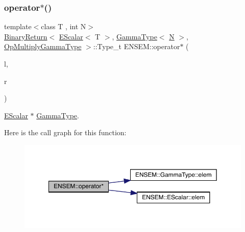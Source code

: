 \subsubsection{\texorpdfstring{operator$\ast$()}{operator*()}\hspace{0.1cm}{\footnotesize\ttfamily [5/9]}}
{\footnotesize\ttfamily template$<$class T , int N$>$ \\
\mbox{\hyperlink{structENSEM_1_1BinaryReturn}{Binary\+Return}}$<$ \mbox{\hyperlink{classENSEM_1_1EScalar}{E\+Scalar}}$<$ T $>$, \mbox{\hyperlink{classENSEM_1_1GammaType}{Gamma\+Type}}$<$ \mbox{\hyperlink{operator__name__util_8cc_a7722c8ecbb62d99aee7ce68b1752f337}{N}} $>$, \mbox{\hyperlink{structENSEM_1_1OpMultiplyGammaType}{Op\+Multiply\+Gamma\+Type}} $>$\+::Type\+\_\+t E\+N\+S\+E\+M\+::operator$\ast$ (\begin{DoxyParamCaption}\item[{const \mbox{\hyperlink{classENSEM_1_1EScalar}{E\+Scalar}}$<$ T $>$ \&}]{l,  }\item[{const \mbox{\hyperlink{classENSEM_1_1GammaType}{Gamma\+Type}}$<$ \mbox{\hyperlink{operator__name__util_8cc_a7722c8ecbb62d99aee7ce68b1752f337}{N}} $>$ \&}]{r }\end{DoxyParamCaption})\hspace{0.3cm}{\ttfamily [inline]}}



\mbox{\hyperlink{classENSEM_1_1EScalar}{E\+Scalar}} $\ast$ \mbox{\hyperlink{classENSEM_1_1GammaType}{Gamma\+Type}}. 

Here is the call graph for this function\+:
\nopagebreak
\begin{figure}[H]
\begin{center}
\leavevmode
\includegraphics[width=350pt]{d4/dca/group__escalar_gacd3a5ba72921d671ee94910188b8c179_cgraph}
\end{center}
\end{figure}
\mbox{\label{group__escalar_ga37b9d878f5157952ec965d47a1032bc0}} 
